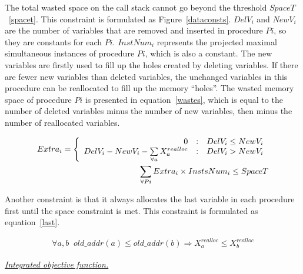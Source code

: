 The total wasted space on the call stack cannot go beyond the threshold $SpaceT$~\ref{spacet}.
This constraint is formulated as Figure~\ref{dataconsts}.
$DelV_i$ and $NewV_i$ are the number of variables that are removed and inserted
in procedure $Pi$, so they are constants for each $Pi$.
$InstNum_i$ represents the projected maximal simultaneous instances of procedure $Pi$,
which is also a constant. 
The new variables are firstly used to fill up the holes created by deleting variables.
If there are fewer new variables than deleted variables, the unchanged variables
in this procedure can be reallocated to fill up the memory ``holes''.
The wasted memory space of procedure $Pi$ is presented in equation~\ref{wastes},
which is equal to the number of deleted variables minus the number of new variables,
then minus the number of reallocated variables.

\begin{figure}[ht]
\begin{small}
\begin{eqnarray}
Extra_i = \left\{\begin{array}{r@{\quad:\quad}l}
0  & \mbox{$DelV_i \leq NewV_i$}\\
DelV_i - NewV_i -{\sum\limits_{\forall a}{X_{a}^{realloc}}}&  \mbox{$DelV_i > NewV_i$}
\end{array}\right.  \label{wastes} \\
\sum_{\forall Pi}{Extra_i\times InstsNum_i } \leq SpaceT 
\end{eqnarray}
\end{small}
\end{figure}


Another constraint is that it always allocates the last variable in each procedure first until the
space constraint is met. This constraint is formulated as equation~\ref{last}.
\begin{figure}[ht]
\begin{small}
\begin{eqnarray}
\forall{a,b} \;\; old\_addr(a) \leq old\_addr(b)\Rightarrow  X_{a}^{realloc} \leq X_{b}^{realloc}\label{last}
\end{eqnarray}
\end{small}
\end{figure}



{\underline{\em Integrated objective function.}}

